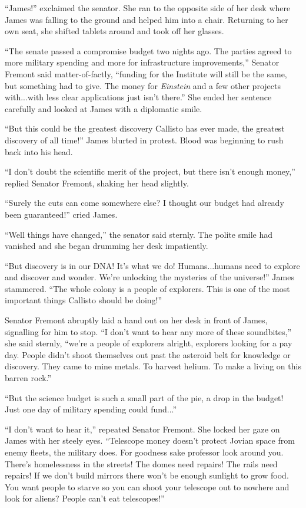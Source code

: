 \documentclass[openany, 12pt]{book} %
\begin{document}
``James!'' exclaimed the senator. She ran to the opposite side of her desk where James was falling to the ground and helped him into a chair. Returning to her own seat, she shifted tablets around and took off her glasses.

``The senate passed a compromise budget two nights ago. The parties agreed to more military spending and more for infrastructure improvements,'' Senator Fremont said matter-of-factly, ``funding for the Institute will still be the same, but something had to give. The money for \textit{Einstein} and a few other projects with...with less clear applications just isn't there.'' She ended her sentence carefully and looked at James with a diplomatic smile.

``But this could be the greatest discovery Callisto has ever made, the greatest discovery of all time!'' James blurted in protest. Blood was beginning to rush back into his head.

``I don't doubt the scientific merit of the project, but there isn't enough money,'' replied Senator Fremont, shaking her head slightly.

``Surely the cuts can come somewhere else? I thought our budget had already been guaranteed!'' cried James.

``Well things have changed,'' the senator said sternly. The polite smile had vanished and she began drumming her desk impatiently.

``But discovery is in our DNA! It's what we do! Humans...humans need to explore and discover and wonder. We're unlocking the mysteries of the universe!'' James stammered. ``The whole colony is a people of explorers. This is one of the most important things Callisto should be doing!''

Senator Fremont abruptly laid a hand out on her desk in front of James, signalling for him to stop. ``I don't want to hear any more of these soundbites,'' she said sternly, ``we're a people of explorers alright, explorers looking for a pay day. People didn't shoot themselves out past the asteroid belt for knowledge or discovery. They came to mine metals. To harvest helium. To make a living on this barren rock.''

``But the science budget is such a small part of the pie, a drop in the budget! Just one day of military spending could fund...''

``I don't want to hear it,'' repeated Senator Fremont. She locked her gaze on James with her steely eyes. ``Telescope money doesn't protect Jovian space from enemy fleets, the military does. For goodness sake professor look around you. There's homelessness in the streets! The domes need repairs! The rails need repairs! If we don't build mirrors there won't be enough sunlight to grow food. You want people to starve so you can shoot your telescope out to nowhere and look for aliens? People can't eat telescopes!''
\end{document}

